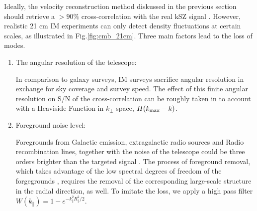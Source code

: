 \label{sec:21cm}
Ideally, the velocity reconstruction method diskussed in the previous section should retrieve a $>90\%$ cross-correlation with the real kSZ signal \cite{Shao11}. However, realistic 21 cm IM experiments can only detect density fluctuations at certain scales, as illustrated in Fig.\ref{fig:cmb_21cm}. Three main factors lead to the loss of modes. 
\begin{enumerate}
\item The angular resolution of the telescope:
 
In comparison to galaxy surveys, IM surveys sacrifice angular resolution in exchange for sky coverage and survey speed. The effect of this finite angular resolution on S/N of the cross-correlation can be roughly taken in to account with a Heaviside Function in $k_\perp$ space, $H(k_\mathrm{max}-k)$.

\item Foreground noise level:

Foregrounds from Galactic emission, extragalactic radio sources and Radio recombination lines, together with the noise of the telescope could be three orders brighter than the targeted signal \cite{DiMatteo04,Masui13}. The process of foreground removal, which takes advantage of the low spectral degrees of freedom of the forgegrounds \cite{Switzer15}, requires the removal of the corresponding large-scale structure in the radial direction, as well. To imitate the loss, we apply a high pass filter $W(k_\parallel)=1-e^{-k_\parallel^2R_\parallel^2/2}$.


\end{enumerate}
